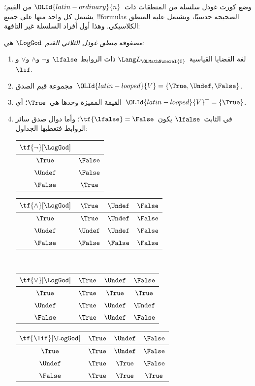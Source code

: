 \documentclass[../../../include/open-logic-section]{subfiles}
\begin{document}


وضع كورت غودل سلسلة من المنطقات ذات~${\OLId{latin-ordinary}{n}}$ من القيم؛ يشتمل كل واحد
منها على جميع~!!{formula}s الصحيحة حدسيًا، ويشتمل عليه المنطق
الكلاسيكي. وهذا أول أفراد السلسلة غير التافهة:

\begin{defn}
مصفوفة \emph{منطق غودل الثلاثي القيم}~$\LogGod$ هي:
\begin{enumerate}
  \item لغة القضايا القياسية~$\Lang L_{\OLMathNumeral{0}}$ ذات الروابط
  $\lfalse$ و$\lnot$ و$\land$ و$\lor$ و$\lif$.
  \item مجموعة قيم الصدق~${\OLId{latin-looped}{V}} = \{\True, \Undef, \False\}$.
  \item القيمة المميزة وحدها هي~$\True$؛ أي~${\OLId{latin-looped}{V}}^+ = \{\True\}$.
  \item في الثابت~$\lfalse$ يكون~$\tf{\lfalse} = \False$؛ وأما
  دوال صدق سائر الروابط فتعطيها الجداول:
  \begin{center}
    \begin{tabular}{c|c}
      $\tf{\lnot}[\LogGod]$ & \\
      \hline
      $\True$ & $\False$ \\
      $\Undef$ & $\False$ \\
      $\False$ & $\True$
    \end{tabular}
    \quad
    \begin{tabular}{c|ccc}
      $\tf{\land}[\LogGod]$ & $\True$ & $\Undef$ & $\False$ \\
      \hline
      $\True$ & $\True$ & $\Undef$ & $\False$ \\
      $\Undef$ & $\Undef$ & $\Undef$ & $\False$\\
      $\False$ & $\False$ & $\False$ & $\False$
    \end{tabular}
    \\[2ex]
    \begin{tabular}{c|ccc}
      $\tf{\lor}[\LogGod]$ & $\True$ & $\Undef$ & $\False$ \\
      \hline
      $\True$ & $\True$ & $\True$ & $\True$ \\
      $\Undef$ & $\True$ & $\Undef$ & $\Undef$ \\
      $\False$ & $\True$ & $\Undef$ & $\False$
    \end{tabular}
    \quad
    \begin{tabular}{c|ccc}
      $\tf{\lif}[\LogGod]$ & $\True$ & $\Undef$ & $\False$ \\
      \hline
      $\True$ & $\True$ & $\Undef$ & $\False$ \\
      $\Undef$ & $\True$ & $\True$ & $\False$  \\
      $\False$ & $\True$ & $\True$ & $\True$
    \end{tabular}
  \end{center}
\end{enumerate}
\end{defn}
\end{document}
